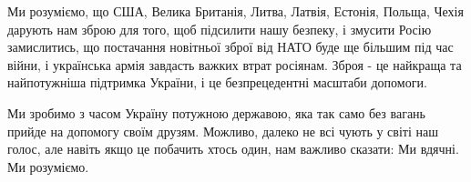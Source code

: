 Ми розуміємо, що США, Велика Британія, Литва, Латвія, Естонія, Польща, Чехія
дарують нам зброю для того, щоб підсилити нашу безпеку, і змусити Росію
замислитись, що постачання новітньої зброї від НАТО буде ще більшим під час
війни, і українська армія завдасть важких втрат росіянам. Зброя  - це найкраща
та найпотужніша підтримка України, і це безпрецедентні масштаби допомоги. 

Ми зробимо з часом Україну потужною державою, яка так само без вагань прийде на
допомогу своїм друзям. Можливо, далеко не всі чують у світі наш голос, але
навіть якщо це побачить хтось один, нам важливо сказати:  Ми вдячні. Ми
розуміємо.
